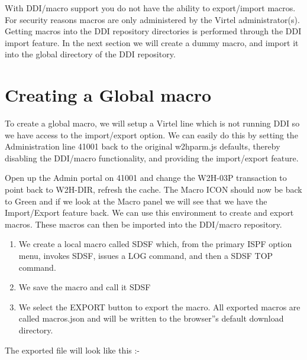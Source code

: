 \documentclass[letterpaper,10pt,english]{sphinxmanual}
\begin{document}
With DDI/macro support you do not have the ability to export/import macros. For security reasons macros are only administered by the Virtel administrator(s). Getting macros into the DDI repository directories is performed through the DDI import feature. In the next section we will create a dummy macro, and import it into the global directory of the DDI repository.


\section{Creating a Global macro}
\label{\detokenize{TN202002:creating-a-global-macro}}
To create a global macro, we will setup a Virtel line which is not running DDI so we have access to the import/export option. We can easily do this by setting the Administration line 41001 back to the original w2hparm.js defaults, thereby disabling the DDI/macro functionality, and providing the import/export feature.

Open up the Admin portal on 41001 and change the W2H-03P transaction to point back to W2H-DIR, refresh the cache. The Macro ICON should now be back to Green and if we look at the Macro panel we will see that we have the Import/Export feature back. We can use this environment to create and export macros. These macros can then be imported into the DDI/macro repository.

\begin{enumerate}
\def\theenumi{\arabic{enumi}}
\def\labelenumi{\theenumi .}
\makeatletter\def\p@enumii{\p@enumi \theenumi .}\makeatother
\item {} 
We create a local macro called SDSF which, from the primary ISPF option menu, invokes SDSF, issues a LOG command, and then a SDSF TOP command.

\item {} 
We save the macro and call it SDSF

\item {} 
We select the EXPORT button to export the macro. All exported macros are called macros.json and will be written to the browser”s default download directory.

\end{enumerate}

The exported file will look like this :-
\end{document}
